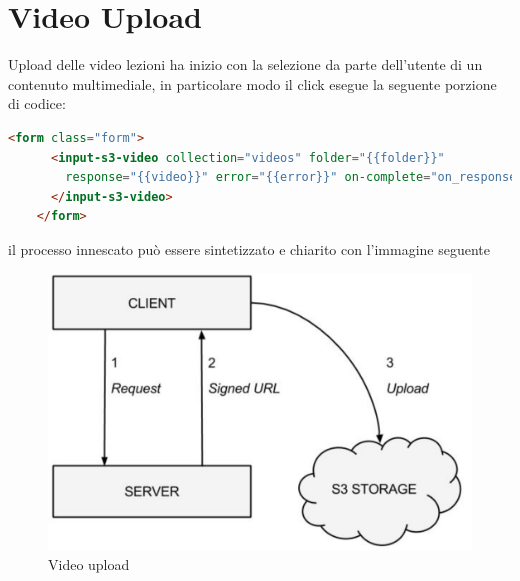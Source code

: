 \section{Video Upload}
\label{sec:video_upload}

Upload delle video lezioni ha inizio con la selezione da parte dell’utente di un contenuto multimediale, in particolare modo il click esegue la seguente porzione di codice:
\begin{lstlisting}[language=html]
   <form class="form">
      <input-s3-video collection="videos" folder="{{folder}}"
        response="{{video}}" error="{{error}}" on-complete="on_response">
      </input-s3-video>
    </form>
\end{lstlisting}

il processo innescato può essere sintetizzato e chiarito con l’immagine seguente


\begin{figure}[htb]
 \centering
 \includegraphics[width=1.0\linewidth]{images/chapter6/upload.png}\hfill
 \caption[Web Components]{Video upload}
 \label{fig:fourV}
\end{figure}




